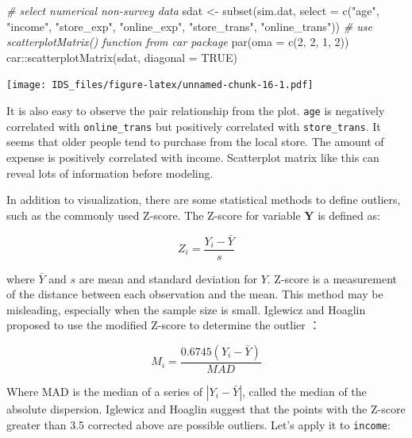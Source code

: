 \documentclass[
  12pt,
]{krantz}
\makeatletter
\newenvironment{Shaded}{\begin{snugshade}}{\end{snugshade}}
\newcommand{\AttributeTok}[1]{\textcolor[rgb]{0.61,0.61,0.61}{#1}}
\newcommand{\CommentTok}[1]{\textcolor[rgb]{0.37,0.37,0.37}{\textit{#1}}}
\newcommand{\ConstantTok}[1]{\textcolor[rgb]{0,0,0}{#1}}
\newcommand{\DecValTok}[1]{\textcolor[rgb]{0.06,0.06,0.06}{#1}}
\newcommand{\FunctionTok}[1]{\textcolor[rgb]{0,0,0}{#1}}
\newcommand{\NormalTok}[1]{#1}
\newcommand{\OtherTok}[1]{\textcolor[rgb]{0.37,0.37,0.37}{#1}}
\newcommand{\SpecialCharTok}[1]{\textcolor[rgb]{0,0,0}{#1}}
\newcommand{\StringTok}[1]{\textcolor[rgb]{0.5,0.5,0.5}{#1}}
\newenvironment{kframe}{%
\medskip{}
\setlength{\fboxsep}{.8em}
 \def\at@end@of@kframe{}%
 \ifinner\ifhmode%
  \def\at@end@of@kframe{\end{minipage}}%
  \begin{minipage}{\columnwidth}%
 \fi\fi%
 \def\FrameCommand##1{\hskip\@totalleftmargin \hskip-\fboxsep
 \colorbox{shadecolor}{##1}\hskip-\fboxsep
     \hskip-\linewidth \hskip-\@totalleftmargin \hskip\columnwidth}%
 \MakeFramed {\advance\hsize-\width
   \@totalleftmargin\z@ \linewidth\hsize
   \@setminipage}}%
 {\par\unskip\endMakeFramed%
 \at@end@of@kframe}
\renewenvironment{Shaded}{\begin{kframe}}{\end{kframe}}
\makeatother
\begin{document}
\begin{Shaded}
\begin{Highlighting}[]
\CommentTok{\# select numerical non{-}survey data}
\NormalTok{sdat }\OtherTok{\textless{}{-}} \FunctionTok{subset}\NormalTok{(sim.dat, }\AttributeTok{select =} \FunctionTok{c}\NormalTok{(}\StringTok{"age"}\NormalTok{, }\StringTok{"income"}\NormalTok{, }\StringTok{"store\_exp"}\NormalTok{, }
    \StringTok{"online\_exp"}\NormalTok{, }\StringTok{"store\_trans"}\NormalTok{, }\StringTok{"online\_trans"}\NormalTok{))}
\CommentTok{\# use scatterplotMatrix() function from car package}
\FunctionTok{par}\NormalTok{(}\AttributeTok{oma =} \FunctionTok{c}\NormalTok{(}\DecValTok{2}\NormalTok{, }\DecValTok{2}\NormalTok{, }\DecValTok{1}\NormalTok{, }\DecValTok{2}\NormalTok{))}
\NormalTok{car}\SpecialCharTok{::}\FunctionTok{scatterplotMatrix}\NormalTok{(sdat, }\AttributeTok{diagonal =} \ConstantTok{TRUE}\NormalTok{)}
\end{Highlighting}
\end{Shaded}

\texttt{[image: IDS\_files/figure-latex/unnamed-chunk-16-1.pdf]}

It is also easy to observe the pair relationship from the plot. \texttt{age} is negatively correlated with \texttt{online\_trans} but positively correlated with \texttt{store\_trans}. It seems that older people tend to purchase from the local store. The amount of expense is positively correlated with income. Scatterplot matrix like this can reveal lots of information before modeling.

In addition to visualization, there are some statistical methods to define outliers, such as the commonly used Z-score. The Z-score for variable \(\mathbf{Y}\) is defined as:

\[Z_{i}=\frac{Y_{i}-\bar{Y}}{s}\]

where \(\bar{Y}\) and \(s\) are mean and standard deviation for \(Y\). Z-score is a measurement of the distance between each observation and the mean. This method may be misleading, especially when the sample size is small. Iglewicz and Hoaglin proposed to use the modified Z-score to determine the outlier \citep{mad1}：

\[M_{i}=\frac{0.6745(Y_{i}-\bar{Y})}{MAD}\]

Where MAD is the median of a series of \(|Y_ {i} - \bar{Y}|\), called the median of the absolute dispersion. Iglewicz and Hoaglin suggest that the points with the Z-score greater than 3.5 corrected above are possible outliers. Let's apply it to \texttt{income}:
\end{document}
